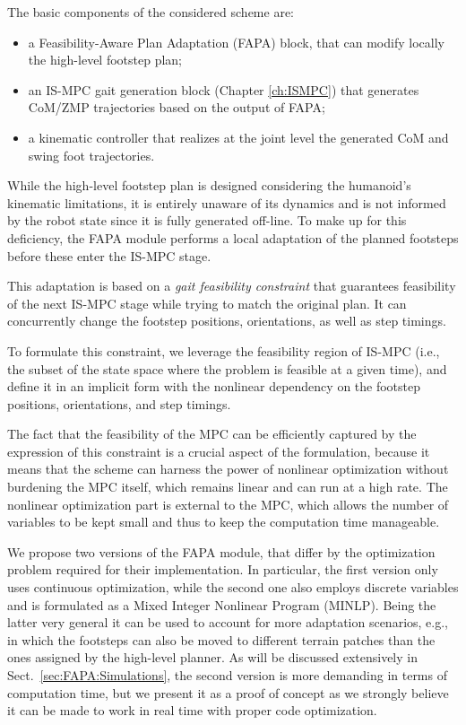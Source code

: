 The basic components of the considered scheme are:
\begin{itemize}
    \item a Feasibility-Aware Plan Adaptation (FAPA) block, that can modify locally
        the high-level footstep plan;
    \item an IS-MPC gait generation block (Chapter \ref{ch:ISMPC}) that generates CoM/ZMP trajectories based
        on the output of FAPA;
    \item a kinematic controller that realizes at the joint level the generated
        CoM and swing foot trajectories.
\end{itemize}

While the high-level footstep plan is designed considering the humanoid's
kinematic limitations, it is entirely unaware of its dynamics and is not
informed by the robot state since it is fully generated off-line.
To make up for this deficiency, the FAPA module performs a local adaptation of
the planned footsteps before these enter the IS-MPC stage. 

This adaptation is based on a {\em gait feasibility constraint} that guarantees
feasibility of the next IS-MPC stage while trying to match the original plan.
It can concurrently change the footstep positions, orientations, as well as
step timings. 

To formulate this constraint, we leverage the feasibility region of IS-MPC
(i.e., the subset of the state space where the problem is feasible at a given
time), and define it in an implicit form with the nonlinear dependency on the footstep
positions, orientations, and step timings.

The fact that the feasibility of the MPC can be efficiently captured by
the expression of this constraint is a crucial aspect of the formulation,
because it means that the scheme can harness the power of nonlinear
optimization without burdening the MPC itself, which remains linear and can
run at a high rate. The nonlinear optimization part is external to the MPC,
which allows the number of variables to be kept small and thus to keep the
computation time manageable.

We propose two versions of the FAPA module, that differ by the optimization
problem required for their implementation. In particular, the first version
only uses continuous optimization, while the second one also employs discrete
variables and is formulated as a Mixed Integer Nonlinear Program (MINLP).
Being the latter very general it can be used to account for more adaptation
scenarios, e.g., in which the footsteps can also be moved to different terrain
patches than the ones assigned by the high-level planner. As will be discussed
extensively in Sect.~\ref{sec:FAPA:Simulations}, the second version is more
demanding in terms of computation time, but we present it as a proof of
concept as we strongly believe it can be made to work in real time with proper
code optimization.


